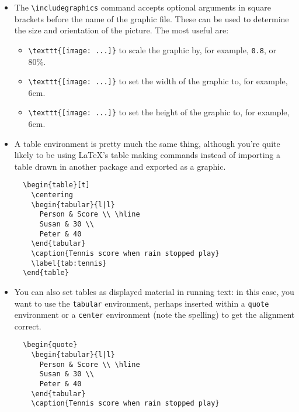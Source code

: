 \documentclass[dissertation]{softeng}
\begin{document}
\begin{itemize}
  The \verb|\caption| command creates a caption using the supplied
  text, and the \verb|\label| command defines a label for referring to
  this figure in the text (see Section~\ref{sec:labelling} below).
\item The \verb|\includegraphics| command accepts optional arguments
  in square brackets before the name of the graphic file.  These can
  be used to determine the size and orientation of the picture.  The
  most useful are:
  \begin{itemize}
  \item \verb|\texttt{[image: ...]}| to scale the graphic
    by, for example, \verb|0.8|, or 80\%.
  \item \verb|\texttt{[image: ...]}| to set the
    width of the graphic to, for example, 6cm.  
  \item \verb|\texttt{[image: ...]}| to set the
    height of the graphic to, for example, 6cm.  
  \end{itemize}
\item A table environment is pretty much the same thing, although
  you're quite likely to be using {\LaTeX}'s table making commands
  instead of importing a table drawn in another package and exported
  as a graphic.  
\begin{verbatim}
  \begin{table}[t]
    \centering
    \begin{tabular}{l|l}
      Person & Score \\ \hline
      Susan & 30 \\
      Peter & 40 
    \end{tabular}
    \caption{Tennis score when rain stopped play}
    \label{tab:tennis}
  \end{table}
\end{verbatim}
\item You can also set tables as displayed material in running text:
  in this case, you want to use the \verb|tabular| environment,
  perhaps inserted within a \verb|quote| environment or a
  \verb|center| environment (note the spelling) to get the alignment
  correct.
\begin{verbatim}
  \begin{quote}
    \begin{tabular}{l|l}
      Person & Score \\ \hline
      Susan & 30 \\
      Peter & 40 
    \end{tabular}
    \caption{Tennis score when rain stopped play}

\end{verbatim}
\end{itemize}
\end{document}
